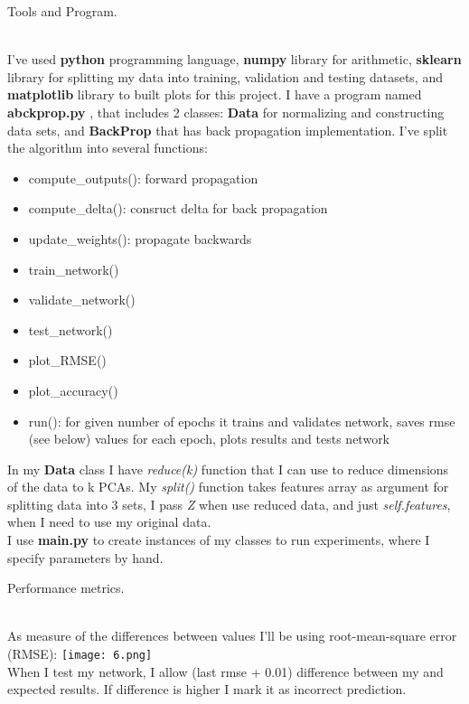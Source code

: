 \documentclass[12pt, letterpaper]{article}
\begin{document}
\begin{enumerate}[label=\Roman*.]
	{\bf \item Tools and Program.}\\
	
	I've used {\bf python} programming language, {\bf numpy} library for arithmetic, {\bf sklearn} library for splitting my data into training, validation and testing datasets, and {\bf matplotlib} library to built plots for this project. I have a program named {\bf abckprop.py} , that includes 2 classes: {\bf Data} for normalizing and constructing data sets, and {\bf BackProp} that has back propagation implementation. I've split the algorithm into several functions:
	\begin{itemize}
		\item compute\_outputs(): forward propagation
		\item compute\_delta(): consruct delta for back propagation
		\item update\_weights(): propagate backwards
		\item train\_network()
		\item validate\_network()
		\item test\_network()
		\item plot\_RMSE()
		\item plot\_accuracy()
		\item run(): for given number of epochs it trains and validates network, saves rmse (see below) values for each epoch, plots results and tests network
	\end{itemize}
	
	In my {\bf Data} class I have {\it reduce(k)} function that I can use to reduce dimensions of the data to k PCAs. My {\it split()} function takes features array as argument for splitting data into 3 sets, I pass {\it Z} when use reduced data, and just {\it self.features}, when I need to use my original data.\\
	
	I use {\bf main.py} to create instances of my classes to run experiments, where I specify parameters by hand.\\
	
	{\bf \item Performance metrics.}\\
	
	As measure of the differences between values I'll be using root-mean-square error (RMSE):
	{\center \texttt{[image: 6.png]} \\}
	When I test my network, I allow (last rmse + 0.01)  difference between my and expected results. If difference is higher I mark it as incorrect prediction. \\
	

\end{enumerate}
\end{document}
